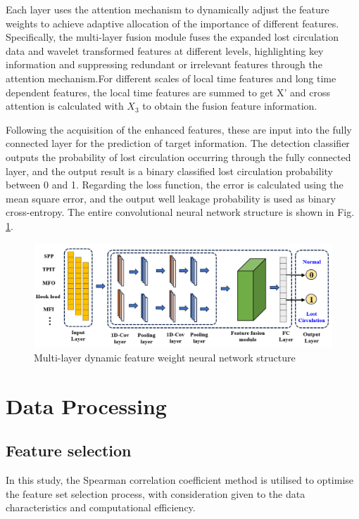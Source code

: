\documentclass[journal,article,submit,pdftex,moreauthors]{Definitions/mdpi}
\begin{document}
Each layer uses the attention mechanism to dynamically adjust the feature weights to achieve adaptive allocation of the importance of different features. Specifically, the multi-layer fusion module fuses the expanded lost circulation data and wavelet transformed features at different levels, highlighting key information and suppressing redundant or irrelevant features through the attention mechanism.For different scales of local time features and long time dependent features, the local time features are summed to get X' and cross attention is calculated with \({{X}_{3}}\) to obtain the fusion feature information.



Following the acquisition of the enhanced features, these are input into the fully connected layer for the prediction of target information. The detection classifier outputs the probability of lost circulation occurring through the fully connected layer, and the output result is a binary classified lost circulation probability between 0 and 1. Regarding the loss function, the error is calculated using the mean square error, and the output well leakage probability is used as binary cross-entropy. The entire convolutional neural network structure is shown in Fig. \ref{fig:Multi-layer dynamic feature weight neural network structure}.
\begin{figure}[H]
    \centering
    \includegraphics[width=0.75\linewidth]{图片/多尺度融合网络.png}
    \caption{Multi-layer dynamic feature weight neural network structure}
    \label{fig:Multi-layer dynamic feature weight neural network structure}
\end{figure}

\section{Data Processing}
\subsection{Feature selection}

In this study, the Spearman correlation coefficient method is utilised to optimise the feature set selection process, with consideration given to the data characteristics and computational efficiency.
\end{document}
